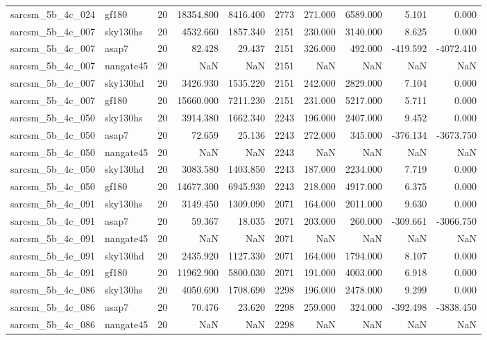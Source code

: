 \begin{tabular}{llrrrrrrrr}
sarcsm\_5b\_4c\_024 & gf180 & 20 & 18354.800 & 8416.400 & 2773 & 271.000 & 6589.000 & 5.101 & 0.000 \\
sarcsm\_5b\_4c\_007 & sky130hs & 20 & 4532.660 & 1857.340 & 2151 & 230.000 & 3140.000 & 8.625 & 0.000 \\
sarcsm\_5b\_4c\_007 & asap7 & 20 & 82.428 & 29.437 & 2151 & 326.000 & 492.000 & -419.592 & -4072.410 \\
sarcsm\_5b\_4c\_007 & nangate45 & 20 & NaN & NaN & 2151 & NaN & NaN & NaN & NaN \\
sarcsm\_5b\_4c\_007 & sky130hd & 20 & 3426.930 & 1535.220 & 2151 & 242.000 & 2829.000 & 7.104 & 0.000 \\
sarcsm\_5b\_4c\_007 & gf180 & 20 & 15660.000 & 7211.230 & 2151 & 231.000 & 5217.000 & 5.711 & 0.000 \\
sarcsm\_5b\_4c\_050 & sky130hs & 20 & 3914.380 & 1662.340 & 2243 & 196.000 & 2407.000 & 9.452 & 0.000 \\
sarcsm\_5b\_4c\_050 & asap7 & 20 & 72.659 & 25.136 & 2243 & 272.000 & 345.000 & -376.134 & -3673.750 \\
sarcsm\_5b\_4c\_050 & nangate45 & 20 & NaN & NaN & 2243 & NaN & NaN & NaN & NaN \\
sarcsm\_5b\_4c\_050 & sky130hd & 20 & 3083.580 & 1403.850 & 2243 & 187.000 & 2234.000 & 7.719 & 0.000 \\
sarcsm\_5b\_4c\_050 & gf180 & 20 & 14677.300 & 6945.930 & 2243 & 218.000 & 4917.000 & 6.375 & 0.000 \\
sarcsm\_5b\_4c\_091 & sky130hs & 20 & 3149.450 & 1309.090 & 2071 & 164.000 & 2011.000 & 9.630 & 0.000 \\
sarcsm\_5b\_4c\_091 & asap7 & 20 & 59.367 & 18.035 & 2071 & 203.000 & 260.000 & -309.661 & -3066.750 \\
sarcsm\_5b\_4c\_091 & nangate45 & 20 & NaN & NaN & 2071 & NaN & NaN & NaN & NaN \\
sarcsm\_5b\_4c\_091 & sky130hd & 20 & 2435.920 & 1127.330 & 2071 & 164.000 & 1794.000 & 8.107 & 0.000 \\
sarcsm\_5b\_4c\_091 & gf180 & 20 & 11962.900 & 5800.030 & 2071 & 191.000 & 4003.000 & 6.918 & 0.000 \\
sarcsm\_5b\_4c\_086 & sky130hs & 20 & 4050.690 & 1708.690 & 2298 & 196.000 & 2478.000 & 9.299 & 0.000 \\
sarcsm\_5b\_4c\_086 & asap7 & 20 & 70.476 & 23.620 & 2298 & 259.000 & 324.000 & -392.498 & -3838.450 \\
sarcsm\_5b\_4c\_086 & nangate45 & 20 & NaN & NaN & 2298 & NaN & NaN & NaN & NaN \\

\end{tabular}
